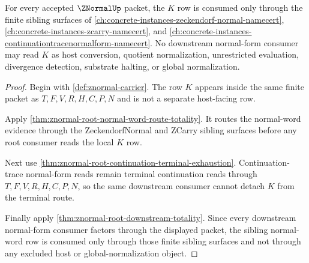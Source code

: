 \begin{theorem}
\label{thm:znormal-root-sibling-normalword-consumption}
For every accepted $\ZNormalUp$ packet, the $K$ row is consumed only through the finite sibling surfaces of \autoref{ch:concrete-instances-zeckendorf-normal-namecert}, \autoref{ch:concrete-instances-zcarry-namecert}, and \autoref{ch:concrete-instances-continuationtracenormalform-namecert}. No downstream normal-form consumer may read $K$ as host conversion, quotient normalization, unrestricted evaluation, divergence detection, substrate halting, or global normalization.
\end{theorem}
\begin{proof}
Begin with \autoref{def:znormal-carrier}. The row $K$ appears inside the same finite packet as $T,F,V,R,H,C,P,N$ and is not a separate host-facing row.

Apply \autoref{thm:znormal-root-normal-word-route-totality}. It routes the normal-word evidence through the ZeckendorfNormal and ZCarry sibling surfaces before any root consumer reads the local $K$ row.

Next use \autoref{thm:znormal-root-continuation-terminal-exhaustion}. Continuation-trace normal-form reads remain terminal continuation reads through $T,F,V,R,H,C,P,N$, so the same downstream consumer cannot detach $K$ from the terminal route.

Finally apply \autoref{thm:znormal-root-downstream-totality}. Since every downstream normal-form consumer factors through the displayed packet, the sibling normal-word row is consumed only through those finite sibling surfaces and not through any excluded host or global-normalization object.
\end{proof}

